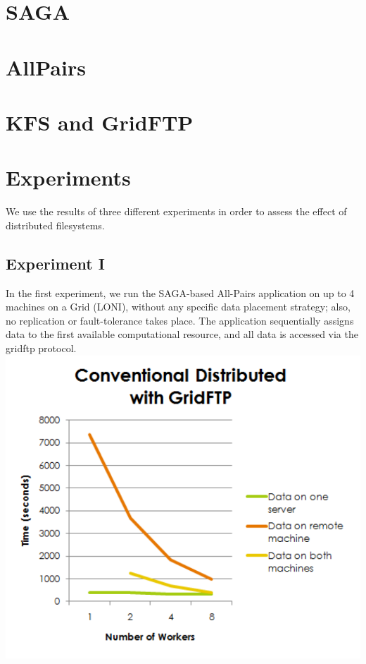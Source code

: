 \documentclass{rspublic}
\begin{document}
\section{SAGA} \section{AllPairs} \section{KFS and GridFTP}
\section{Experiments} We use the results of three different experiments
in order to assess the effect of distributed filesystems.
\subsection{Experiment I} In the first experiment, we run the SAGA-based
All-Pairs application on up to 4 machines on a Grid (LONI), without any
specific data placement strategy; also, no replication or
fault-tolerance takes place. The application sequentially assigns data
to the first available computational resource, and all data is accessed
via the gridftp protocol.
\includegraphics[width=\textwidth]{ConventionalDistributed.pdf}
\end{document}
